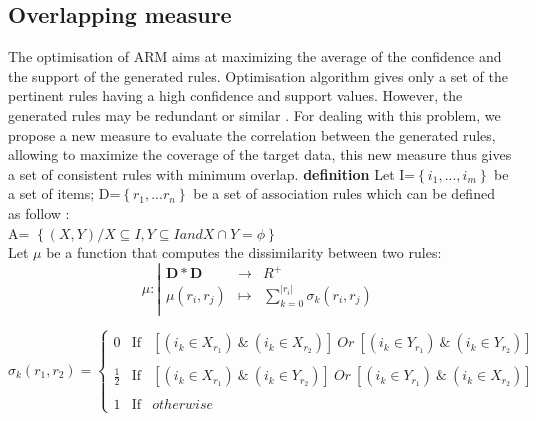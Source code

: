\documentclass[preprint,12pt]{elsarticle}
\begin{document}
\subsection{Overlapping measure}
The optimisation of ARM aims at maximizing the
average of the confidence and the support of the generated
rules. Optimisation algorithm gives only a set of the pertinent
rules having a high confidence and support values. However, the
generated rules may be redundant or similar \cite{27}. For dealing with this
problem, we propose a new measure to evaluate the correlation
between the generated rules, allowing to maximize the coverage of
the target data, this new measure thus gives a set of consistent rules with minimum overlap.
\textbf{definition}
Let I=$\left\{i_{1},...,i_{m}\right\}$ be a set of items; D=$\left\{r_{1},...r_{n}\right\}$ be a set of association rules which can be defined as follow :  \\
A= $\left\{ (X,Y) / X  \subseteq  I, Y   \subseteq  I and X  \cap  Y =  \phi   \right\}$ \\
Let $\mu$ be a function that computes the dissimilarity between two rules:
\begin{displaymath}
\mu :
\left|
  \begin{array}{rcl}
    \mathbf{D*D} & \longrightarrow & {R^{+}} \\
    \mu (r_{i},r_{j}) & \longmapsto & \sum_{k=0}^{\left|r_i\right|}{\sigma_{k}{(r_{i},r_{j})}} \\
  \end{array}
\right.
\end{displaymath}

\begin{displaymath}
\sigma_{k}{(r_1,r_2)} =
\left\lbrace
\begin{array}{ccc}
0           & \mbox{If} &  [(i_{k} \in X_{r_1} )~\&~(i_{k} \in X_{r_2})]~Or~[(i_{k} \in Y_{r_1} ) ~\&~(i_{k} \in Y_{r_2})]  \\ \\
\frac{1}{2} & \mbox{If} &  [(i_{k} \in X_{r_1} )~\&~(i_{k} \in Y_{r_2})]~Or~[(i_{k} \in Y_{r_1} )~\&~(i_{k} \in X_{r_2})]\\\\
1           & \mbox{If} & otherwise
\end{array}\right.
\end{displaymath}
\end{document}
